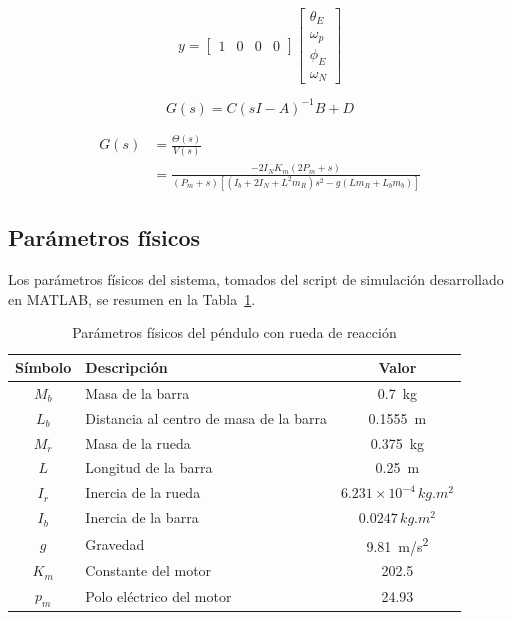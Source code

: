 \documentclass[conference]{IEEEtran}
\begin{document}
\begin{equation}
y = \begin{bmatrix} 1 & 0 & 0 & 0 \end{bmatrix} \begin{bmatrix} \theta_E \\ \omega_p \\ \phi_E \\ \omega_N \end{bmatrix}
\end{equation}


\begin{equation}
G(s) = C(sI - A)^{-1} B + D
\end{equation}

\begin{equation}
\begin{aligned}
G(s) &= \frac{\Theta(s)}{V(s)} \\
&= \frac{-2 I_N K_m (2 P_m + s)}{(P_m + s)\left[(I_b + 2 I_N + L^2 m_R)s^2 - g(L m_R + L_b m_b)\right]}
\end{aligned}
\end{equation}
\subsection{Parámetros físicos}

Los parámetros físicos del sistema, tomados del script de simulación desarrollado en MATLAB, se resumen en la Tabla~\ref{tab:parametros}.

\begin{table}[H]
\centering
\caption{Parámetros físicos del péndulo con rueda de reacción}
\label{tab:parametros}
\renewcommand{\arraystretch}{1.3}
\begin{tabular}{|c|l|c|}
\hline
\textbf{Símbolo} & \textbf{Descripción} & \textbf{Valor} \\
\hline
$M_b$ & Masa de la barra & \SI{0.7}{kg} \\
\hline
$L_b$ & Distancia al centro de masa de la barra & \SI{0.1555}{m} \\
\hline
$M_r$ & Masa de la rueda & \SI{0.375}{kg} \\
\hline
$L$ & Longitud de la barra & \SI{0.25}{m} \\
\hline
$I_r$ & Inercia de la rueda & $6.231\times10^{-4}\,\si{kg.m^2}$ \\
\hline
$I_b$ & Inercia de la barra & $0.0247\,\si{kg.m^2}$ \\
\hline
$g$ & Gravedad & \SI{9.81}{m/s^2} \\
\hline
$K_m$ & Constante del motor & 202.5 \\
\hline
$p_m$ & Polo eléctrico del motor & 24.93 \\
\hline
\end{tabular}
\end{table}
\end{document}
